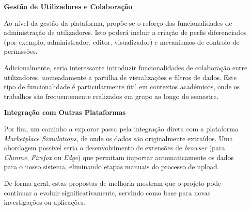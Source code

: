 \textbf{Gestão de Utilizadores e Colaboração}

Ao nível da gestão da plataforma, propõe-se o reforço das funcionalidades de administração de utilizadores. Isto poderá incluir a criação de perfis diferenciados (por exemplo, administrador, editor, visualizador) e mecanismos de controlo de permissões.

Adicionalmente, seria interessante introduzir funcionalidades de colaboração entre utilizadores, nomeadamente a partilha de visualizações e filtros de dados. Este tipo de funcionalidade é particularmente útil em contextos académicos, onde os trabalhos são frequentemente realizados em grupo ao longo do semestre.

\textbf{Integração com Outras Plataformas}

Por fim, um caminho a explorar passa pela integração direta com a plataforma \textit{Marketplace Simulations}, de onde os dados são originalmente extraídos. Uma abordagem possível seria o desenvolvimento de extensões de \textit{browser} (para \textit{Chrome}, \textit{Firefox} ou \textit{Edge}) que permitam importar automaticamente os dados para o nosso sistema, eliminando etapas manuais do processo de upload.

De forma geral, estas propostas de melhoria mostram que o projeto pode continuar a evoluir significativamente, servindo como base para novas investigações ou aplicações.
